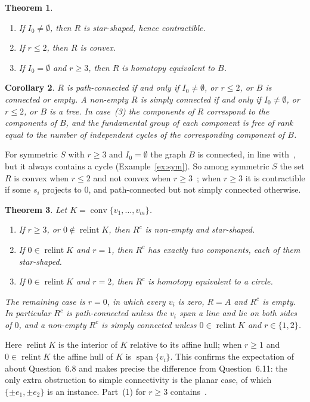\documentclass[11pt]{amsart}
\newtheorem{theorem}{Theorem}[section]
\newtheorem{corollary}[theorem]{Corollary}
\theoremstyle{remark}
\newcommand{\conv}{\operatorname{conv}}
\newcommand{\spn}{\operatorname{span}}
\newcommand{\relint}{\operatorname{relint}}
\begin{document}
\begin{theorem}\label{thm:R}
\begin{enumerate}
\item If $I_0\ne\emptyset$, then $R$ is star-shaped, hence contractible.
\item If $r\le2$, then $R$ is convex.
\item If $I_0=\emptyset$ and $r\ge3$, then $R$ is homotopy equivalent to $B$.
\end{enumerate}
\end{theorem}

\begin{corollary}\label{cor:R}
$R$ is path-connected if and only if $I_0\ne\emptyset$, or $r\le2$, or $B$ is connected or empty. A non-empty $R$ is
simply connected if and only if $I_0\ne\emptyset$, or $r\le 2$, or $B$ is a tree. In case~(3) the components of $R$
correspond to the components of $B$, and the fundamental group of each component is free of rank equal to the number
of independent cycles of the corresponding component of $B$.
\end{corollary}

For symmetric $S$ with $r\ge3$ and $I_0=\emptyset$ the graph $B$ is connected, in line with~\cite[Theorem~6.3]{LMW},
but it always contains a cycle (Example~\ref{ex:sym}). So among symmetric $S$ the set $R$ is convex when $r\le2$ and not
convex when $r\ge3$~\cite[Corollary~6.6]{LMW}; when $r\ge3$ it is contractible if some $s_i$ projects to $0$, and path-connected but not simply connected
otherwise.

\begin{theorem}\label{thm:Rc}
Let $K=\conv\{v_1,\dots,v_m\}$.
\begin{enumerate}
\item If $r\ge3$, or $0\notin\relint K$, then $R^c$ is non-empty and star-shaped.
\item If $0\in\relint K$ and $r=1$, then $R^c$ has exactly two components, each of them star-shaped.
\item If $0\in\relint K$ and $r=2$, then $R^c$ is homotopy equivalent to a circle.
\end{enumerate}
The remaining case is $r=0$, in which every $v_i$ is zero, $R=A$ and $R^c$ is empty.
In particular $R^c$ is path-connected unless the $v_i$ span a line and lie on both sides of $0$, and a non-empty
$R^c$ is simply connected unless $0\in\relint K$ and $r\in\{1,2\}$.
\end{theorem}

Here $\relint K$ is the interior of $K$ relative to its affine hull; when $r\ge 1$ and $0\in \relint K$ the affine hull
of $K$ is $\spn\{v_i\}$. This confirms the expectation of~\cite{LMW} about Question~6.8 and makes precise the
difference from Question~6.11: the only extra obstruction to simple connectivity is the planar case, of which
$\{\pm e_1,\pm e_2\}$ is an instance. Part~(1) for $r\ge3$ contains~\cite[Theorem~6.9 and Corollary~6.10]{LMW}.
\end{document}
